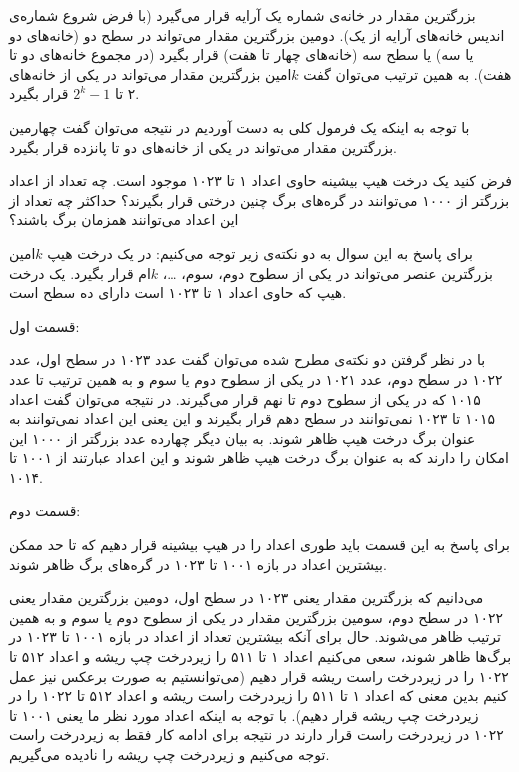 بزرگترین مقدار در خانه‌ی شماره یک آرایه قرار می‌گیرد (با فرض شروع شماره‌ی اندیس خانه‌های آرایه از یک). دومین بزرگترین مقدار می‌تواند در سطح دو (خانه‌های دو یا سه) یا سطح سه (خانه‌های چهار تا هفت) قرار بگیرد (در مجموع خانه‌های دو تا هفت). به همین ترتیب می‌توان گفت {$k$}امین بزرگترین مقدار می‌تواند در یکی از خانه‌های ۲ تا {$2^k-1$} قرار بگیرد.

با توجه به اینکه یک فرمول کلی به دست آوردیم در نتیجه می‌توان گفت چهارمین بزرگترین مقدار می‌تواند در یکی از خانه‌های دو تا پانزده قرار بگیرد.

 فرض کنید یک درخت هیپ  بیشینه حاوی اعداد ۱ تا ۱۰۲۳ موجود است. چه تعداد از اعداد بزرگتر از ۱۰۰۰ می‌توانند در گره‌های برگ چنین درختی قرار بگیرند؟ حداکثر چه تعداد از این اعداد می‌توانند همزمان برگ باشند؟


برای پاسخ به این سوال به دو نکته‌ی زیر توجه می‌کنیم:
 در یک درخت هیپ {$k$}امین بزرگترین عنصر می‌تواند در یکی از سطوح دوم، سوم، {\ldots}، {$k$}ام قرار بگیرد.
  یک درخت هیپ که حاوی اعداد ۱ تا ۱۰۲۳ است دارای ده سطح است.

قسمت اول:

با در نظر گرفتن دو نکته‌ی مطرح شده می‌توان گفت عدد ۱۰۲۳ در سطح اول، عدد ۱۰۲۲ در سطح دوم، عدد ۱۰۲۱ در یکی از سطوح دوم یا سوم و به همین ترتیب تا عدد ۱۰۱۵ که در یکی از سطوح دوم تا نهم قرار می‌گیرند. در نتیجه می‌توان گفت اعداد ۱۰۱۵ تا ۱۰۲۳ نمی‌توانند در سطح دهم قرار بگیرند و این یعنی این اعداد نمی‌توانند به عنوان برگ درخت هیپ ظاهر شوند. به بیان دیگر چهارده عدد بزرگتر از ۱۰۰۰ این امکان را دارند که به عنوان برگ درخت هیپ ظاهر شوند و این اعداد عبارتند از ۱۰۰۱ تا ۱۰۱۴.

قسمت دوم:

برای پاسخ به این قسمت باید طوری اعداد را در هیپ بیشینه قرار دهیم که تا حد ممکن بیشترین اعداد در بازه ۱۰۰۱ تا ۱۰۲۳ در گره‌های برگ ظاهر شوند.

می‌دانیم که بزرگترین مقدار یعنی ۱۰۲۳ در سطح اول، دومین بزرگترین مقدار یعنی ۱۰۲۲ در سطح دوم، سومین بزرگترین مقدار در یکی از سطوح دوم یا سوم و به همین ترتیب ظاهر می‌شوند. حال برای آنکه بیشترین تعداد از اعداد در بازه ۱۰۰۱ تا ۱۰۲۳ در برگ‌ها ظاهر شوند، سعی می‌کنیم اعداد ۱ تا ۵۱۱ را زیردرخت چپ ریشه و اعداد ۵۱۲ تا ۱۰۲۲ را در زیردرخت راست ریشه قرار دهیم (می‌توانستیم به صورت برعکس نیز عمل کنیم بدین معنی که اعداد ۱ تا ۵۱۱ را زیردرخت راست ریشه و اعداد ۵۱۲ تا ۱۰۲۲ را در زیردرخت چپ ریشه قرار دهیم). با توجه به اینکه اعداد مورد نظر ما یعنی ۱۰۰۱ تا ۱۰۲۲ در زیردرخت راست قرار دارند در نتیجه برای ادامه کار فقط به زیردرخت راست توجه می‌کنیم و زیردرخت چپ ریشه را نادیده می‌گیریم. 


